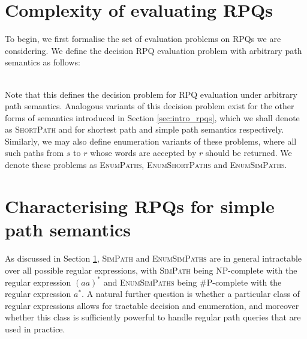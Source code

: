 \documentclass{article}
\begin{document}
\section{Complexity of evaluating RPQs}
\label{sec:complexity}

To begin, we first formalise the set of evaluation problems on RPQs we are considering. We define the decision RPQ evaluation problem with arbitrary path semantics as follows:

 \\

Note that this defines the decision problem for RPQ evaluation under arbitrary path semantics. Analogous variants of this decision problem exist for the other forms of semantics introduced in Section \ref{sec:intro_rpqs}, which we shall denote as \textsc{ShortPath} and  for shortest path and simple path semantics respectively. Similarly, we may also define enumeration variants of these problems, where all such paths from $s$ to $r$ whose words are accepted by $r$ should be returned. We denote these problems as \textsc{EnumPaths}, \textsc{EnumShortPaths} and \textsc{EnumSimPaths}.



\section{Characterising RPQs for simple path semantics}
\label{sec:simple_characterisation}

As discussed in Section \ref{sec:complexity}, \textsc{SimPath} and \textsc{EnumSimPaths} are in general intractable over all possible regular expressions, with \textsc{SimPath} being NP-complete with the regular expression $(aa)^*$ and \textsc{EnumSimPaths} being \#P-complete with the regular expression $a^*$. A natural further question is whether a particular class of regular expressions allows for tractable decision and enumeration, and moreover whether this class is sufficiently powerful to handle regular path queries that are used in practice.
\end{document}
